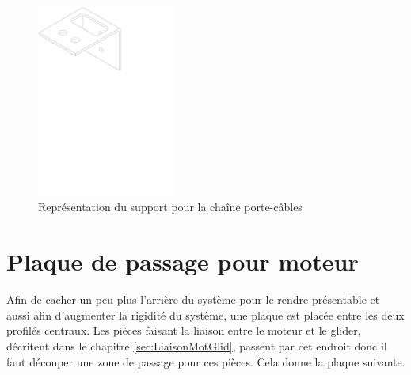 \begin{figure}[H]
  \centering
  \includegraphics[width = 0.4\textwidth]{assets/figures/SupportChaineCable.svg}
  \caption{Représentation du support pour la chaîne porte-câbles}
  \label{fig:SupChaineCable}
\end{figure}

\section{Plaque de passage pour moteur}\label{sec:PlaPassMot}
Afin de cacher un peu plus l'arrière du système pour le rendre présentable et aussi afin d'augmenter la rigidité du système, une plaque est placée
entre les deux profilés centraux. Les pièces faisant la liaison entre le moteur et le glider, décritent dans le chapitre \ref{sec:LiaisonMotGlid},
passent par cet endroit donc il faut découper une zone de passage pour ces pièces. Cela donne la plaque suivante.


